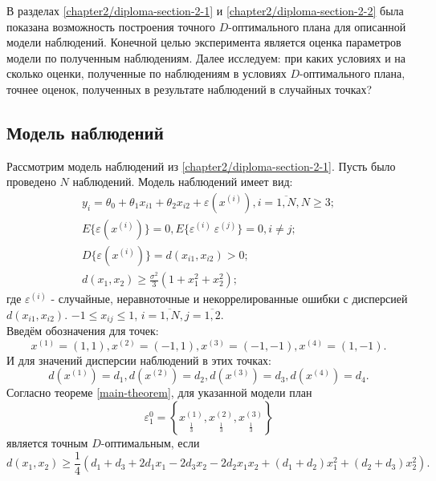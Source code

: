 В разделах \ref{chapter2/diploma-section-2-1} и \ref{chapter2/diploma-section-2-2} была показана возможность построения точного $D$-оптимального плана для описанной модели наблюдений. Конечной целью эксперимента является оценка параметров модели по полученным наблюдениям. Далее исследуем: при каких условиях и на сколько оценки, полученные по наблюдениям в условиях $D$-оптимального плана, точнее оценок, полученных в результате наблюдений в случайных точках?

\subsection{Модель наблюдений}
Рассмотрим модель наблюдений из \ref{chapter2/diploma-section-2-1}.
Пусть было проведено $N$ наблюдений. Модель наблюдений имеет вид:
\begin{gather} \label{numerical-experiment:model:start}
y_i = \theta_0 + \theta_1 x_{i1} + \theta_2 x_{i2} + \varepsilon(x^{(i)}), i = \overline{1, N}, N \ge 3; \\
E\{ \varepsilon(x^{(i)}) \} = 0, E\{ \varepsilon^{(i)}\ \varepsilon^{(j)} \} = 0, i \ne j; \\
D\{ \varepsilon(x^{(i)}) \} = d(x_{i1}, x_{i2}) > 0; \\
d(x_1, x_2) \ge \frac{\sigma^2}{3}(1 + x_1^2 + x_2^2);
\label{numerical-experiment:model:end}
\end{gather}
где $\varepsilon^{(i)}$ - случайные, неравноточные и некоррелированные ошибки с дисперсией $d(x_{i1}, x_{i2})$. $-1 \le x_{ij} \le 1$, $i=\overline{1,N}, j=\overline{1, 2}$.\\
Введём обозначения для точек:
\begin{equation}\label{numerical-experiment:plan-points}
x^{(1)}=(1, 1), x^{(2)}=(-1, 1), x^{(3)}=(-1, -1), x^{(4)}=(1, -1).
\end{equation}
И для значений дисперсии наблюдений в этих точках:
\begin{equation}
d(x^{(1)}) = d_1, d(x^{(2)}) = d_2, d(x^{(3)}) = d_3, d(x^{(4)}) = d_4.
\end{equation}
Согласно теореме \ref{main-theorem}, для указанной модели план
\begin{equation} \label{numerical-expetiment:plan-1}
\varepsilon_1^{0} = \left \{ 
\underset{\frac 1 3} {x^{(1)}},
\underset{\frac 1 3} {x^{(2)}},
\underset{\frac 1 3} {x^{(3)}}
\right \}
\end{equation}
является точным $D$-оптимальным, если
\begin{equation}\label{numerical-experiment:d-eq}
d(x_1, x_2) \ge \frac 1 4 (d_1 + d_3 + 2 d_1 x_1 - 2 d_3 x_2 - 2d_2 x_1 x_2 + (d_1 + d_2)x_1^2 + (d_2 + d_3)x_2^2).
\end{equation}

